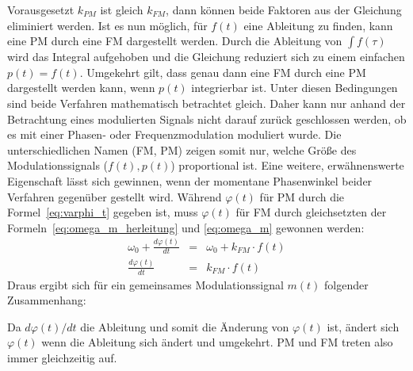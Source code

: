 Vorausgesetzt \(k_{PM}\) ist gleich \(k_{FM}\), dann können beide Faktoren aus der Gleichung eliminiert werden. Ist es nun möglich, für \(f(t)\) eine Ableitung zu finden, kann eine PM durch eine FM dargestellt werden. Durch die Ableitung von \(\int{f(\tau)}\) wird das Integral aufgehoben und die Gleichung reduziert sich zu einem einfachen \(p(t)=f(t)\). Umgekehrt gilt, dass genau dann eine FM durch eine PM dargestellt werden kann, wenn \(p(t)\) integrierbar ist. Unter diesen Bedingungen sind beide Verfahren mathematisch betrachtet gleich. Daher kann nur anhand der Betrachtung eines modulierten Signals nicht darauf zurück geschlossen werden, ob es mit einer Phasen- oder Frequenzmodulation moduliert wurde. Die unterschiedlichen Namen (FM, PM) zeigen somit nur, welche Größe des Modulationssignals (\(f(t), p(t)\)) proportional ist. \cite[S. 210]{lathi}
Eine weitere, erwähnenswerte Eigenschaft lässt sich gewinnen, wenn der momentane Phasenwinkel beider Verfahren gegenüber gestellt wird. Während \(\varphi(t)\) für PM durch die Formel~\ref{eq:varphi_t} gegeben ist, muss \(\varphi(t)\) für FM durch gleichsetzten der Formeln~\ref{eq:omega_m_herleitung} und \ref{eq:omega_m} gewonnen werden:
\begin{eqnarray*}
\omega_0+\frac{d\varphi(t)}{dt}&=&\omega_0+k_{FM}\cdot f(t) \\
\frac{d\varphi(t)}{dt}&=&k_{FM}\cdot f(t)
\end{eqnarray*}
Draus ergibt sich für ein gemeinsames Modulationssignal \(m(t)\) folgender Zusammenhang:
\begin{center}
\end{center}
Da \({d\varphi(t)}/{dt}\) die Ableitung und somit die Änderung von \(\varphi(t)\) ist, ändert sich \(\varphi(t)\) wenn die Ableitung sich ändert und umgekehrt. PM und FM treten also immer gleichzeitig auf.

